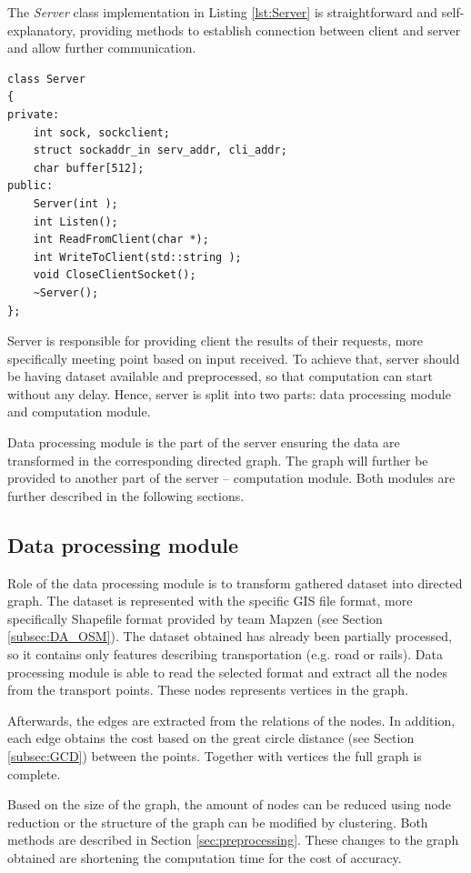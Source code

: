 \documentclass[thesis=M,english]{FITthesis}[2012/10/20]
\begin{document}
The \textit{Server} class implementation in Listing \ref{lst:Server} is straightforward and self-explanatory, providing methods to establish connection between client and server and allow further communication.

\begin{lstlisting}[frame=single, caption={\texttt{Server} class}, label={lst:Server}]
class Server
{
private:
    int sock, sockclient;
	struct sockaddr_in serv_addr, cli_addr;
    char buffer[512];
public:
    Server(int );
    int Listen();
    int ReadFromClient(char *);
    int WriteToClient(std::string );
    void CloseClientSocket();
    ~Server();
};
\end{lstlisting}

Server is responsible for providing client the results of their requests, more specifically meeting point based on input received. To achieve that, server should be having dataset available and preprocessed, so that computation can start without any delay. Hence, server is split into two parts: data processing module and computation module.

Data processing module is the part of the server ensuring the data are transformed in the corresponding directed graph. The graph will further be provided to another part of the server -- computation module. Both modules are further described in the following sections.


\subsection{Data processing module}
\label{subsec:dataprocessing} 
Role of the data processing module is to transform gathered dataset into directed graph. The dataset is represented with the specific GIS file format, more specifically Shapefile format provided by team Mapzen (see Section \ref{subsec:DA_OSM}). The dataset obtained has already been partially processed, so it contains only features describing transportation (e.g. road or rails). Data processing module is able to read the selected format and extract all the nodes from the transport points. These nodes represents vertices in the graph. 

Afterwards, the edges are extracted from the relations of the nodes. In addition, each edge obtains the cost based on the great circle distance (see Section \ref{subsec:GCD}) between the points. Together with vertices the full graph is complete.

Based on the size of the graph, the amount of nodes can be reduced using node reduction or the structure of the graph can be modified by clustering. Both methods are described in Section \ref{sec:preprocessing}. These changes to the graph obtained are shortening the computation time for the cost of accuracy.
\end{document}
